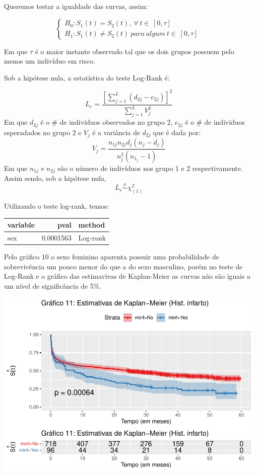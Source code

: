 \documentclass[]{article}
\begin{document}
Queremos testar a igualdade das curvas, assim:

\[ \left\{ \begin{array}{ll}
H_0: S_1(t)=S_2(t), \ \forall \ t \in \ [0,\tau] \\
H_1: S_1(t) \ne S_2(t) \ para \ algum \ t \in \ [0,\tau] \end{array} \right.\ \]

Em que \(\tau\) é o maior instante observado tal que os dois grupos
possuem pelo menos um indivíduo em risco.

Sob a hipótese nula, a estatística do teste Log-Rank é:

\[L_r=\frac{[\sum_{j=1}^{L} (d_{2j}-e_{2j})]^2}{\sum_{j=1}^{L}V_j^2}\]
Em que \(d_{2j}\) é o \(\#\) de indivíduos observados no grupo 2,
\(e_{2j}\) é o \(\#\) de indivíduos esperadados no grupo 2 e \(V_j\) é a
variância de \(d_{2j}\) que é dada por:
\[V_j=\frac{n_{1j}n_{2j}d_j(n_j-d_j)}{n_j^2(n_{1_j}-1)}\] Em que
\(n_{1j}\) e \(n_{2j}\) são o número de indivíduos nos grupo 1 e 2
respectivamente. Assim sendo, sob a hipótese nula,
\[L_r \overset{a}{\sim} \chi^2_{(1)}\]

Utilizando o teste log-rank, temos:

\begin{longtable}[]{@{}lrl@{}}
\toprule
variable & pval & method\tabularnewline
\midrule
\endhead
sex & 0.0001563 & Log-rank\tabularnewline
\bottomrule
\end{longtable}

Pelo gráfico 10 o sexo feminino aparenta possuir uma probabilidade de
sobrevivência um pouco menor do que a do sexo masculino, porém no teste
de Log-Rank e o gráfico das estimavivas de Kaplan-Meier as curvas não
são iguais a um nível de significância de 5\%.

\begin{center}\includegraphics[width=0.75\linewidth]{Atividade_3_files/figure-latex/unnamed-chunk-9-1} \end{center}
\end{document}
